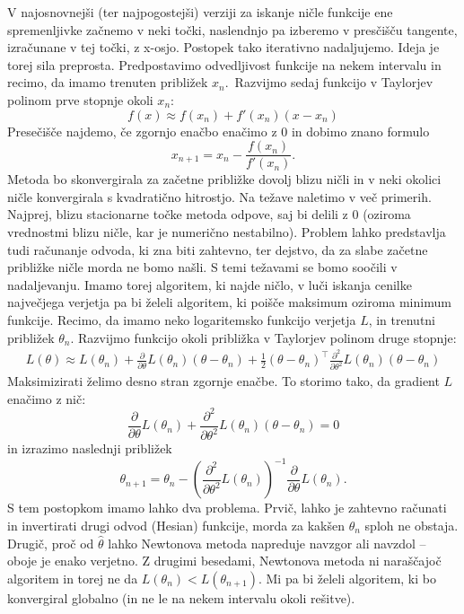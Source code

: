 \documentclass[12pt,a4paper]{amsart}
\theoremstyle{definition} %
\theoremstyle{plain} %
\begin{document}
V najosnovnejši (ter najpogostejši) verziji za iskanje
ničle funkcije ene spremenljivke začnemo v neki točki, naslendnjo pa izberemo v presčišču tangente, izračunane v 
tej točki, z x-osjo. Postopek tako iterativno nadaljujemo. Ideja je torej sila preprosta.
Predpostavimo odvedljivost funkcije na nekem intervalu in recimo, da imamo trenuten približek $x_{n}.$~Razvijmo sedaj funkcijo v Taylorjev
polinom prve stopnje okoli $x_{n}:$
\[
    f(x) \approx f(x_{n}) + f'(x_{n})(x - x_{n})
\]
Presečišče najdemo, če zgornjo enačbo enačimo z 0 in dobimo znano formulo
\[
    x_{n+1} = x_{n} - \frac{f(x_{n})}{f'(x_{n})}.
\]
Metoda bo skonvergirala za začetne približke dovolj blizu ničli in v neki okolici ničle konvergirala s kvadratično hitrostjo. 
Na težave naletimo v več primerih. Najprej, blizu stacionarne točke metoda odpove, saj bi delili z 0 (oziroma vrednostmi blizu ničle, kar je numerično nestabilno).
Problem lahko predstavlja tudi računanje odvoda, ki zna biti zahtevno, ter dejstvo, da za slabe začetne približke ničle morda ne bomo našli. S temi 
težavami se bomo soočili v nadaljevanju.
Imamo torej algoritem, ki najde ničlo, v luči iskanja cenilke največjega verjetja pa bi želeli algoritem, ki poišče maksimum oziroma minimum funkcije.
Recimo, da imamo neko logaritemsko funkcijo verjetja $L$, in trenutni približek $\theta_{n}$. Razvijmo funkcijo okoli približka v Taylorjev polinom
druge stopnje:
\begin{align}\label{taylor}
    L(\theta) \approx L(\theta_{n}) + \frac{\partial}{\partial\theta}L(\theta_{n})(\theta - \theta_{n}) + \frac{1}{2}(\theta - \theta_{n})^\top \frac{\partial^2}{\partial\theta^2}L(\theta_{n})(\theta - \theta_{n}) 
\end{align}
Maksimizirati želimo desno stran zgornje enačbe. To storimo tako, da gradient $L$ enačimo z nič:
\[
    \frac{\partial}{\partial\theta} L(\theta_{n}) + \frac{\partial^2}{\partial\theta^2}L(\theta_{n})(\theta - \theta_{n}) = 0
\]
in izrazimo naslednji približek
\[
    \theta_{n + 1} = \theta_{n} - \left(\frac{\partial^2}{\partial\theta^2}L(\theta_{n})\right)^{-1}\frac{\partial}{\partial\theta}L(\theta_{n}).
\]
S tem postopkom imamo lahko dva problema. Prvič, lahko je zahtevno računati in invertirati drugi odvod (Hesian) funkcije, morda za kakšen $\theta_{n}$ sploh ne obstaja.
Drugič, proč od $\hat{\theta}$ lahko Newtonova metoda napreduje navzgor ali navzdol -- oboje je enako verjetno. Z drugimi besedami, Newtonova metoda ni naraščajoč algoritem in torej
ne da $L(\theta_{n}) < L(\theta_{n+1}).$ Mi pa bi želeli algoritem, ki bo konvergiral globalno (in ne le na nekem intervalu okoli rešitve).
\end{document}
